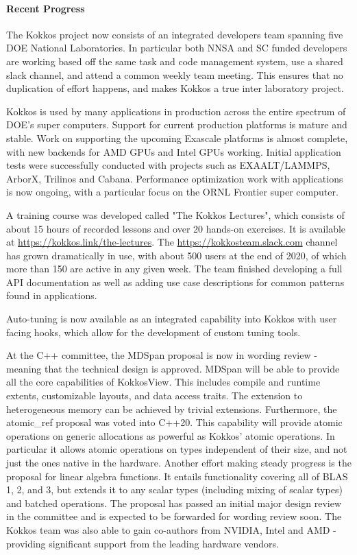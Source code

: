 \paragraph{Recent Progress}

The Kokkos project now consists of an integrated developers team spanning five DOE National Laboratories.
In particular both NNSA and SC funded developers are working based off the same task and code management system, use a shared slack channel, and attend a common weekly team meeting.
This ensures that no duplication of effort happens, and makes Kokkos a true inter laboratory project.

Kokkos is used by many applications in production across the entire spectrum of DOE's super computers.
Support for current production platforms is mature and stable.
Work on supporting the upcoming Exascale platforms is almost complete, with new backends for AMD GPUs and Intel GPUs working. 
Initial application tests were successfully conducted with projects such as EXAALT/LAMMPS, ArborX, Trilinos and Cabana.
Performance optimization work with applications is now ongoing, with a particular focus on the ORNL Frontier super computer.

A training course was developed called "The Kokkos Lectures", which consists of about 15 hours of recorded lessons and over 20 hands-on exercises.
It is available at \url{https://kokkos.link/the-lectures}.
The \url{https://kokkosteam.slack.com} channel has grown dramatically in use, with about 500 users at the end of 2020, of which more than 150 are active in any given week.
The team finished developing a full API documentation as well as adding use case descriptions for common patterns found in applications.

Auto-tuning is now available as an integrated capability into Kokkos with user facing hooks, which allow for the development of custom tuning tools.

At the C++ committee, the MDSpan proposal is now in wording review - meaning that the technical design is approved. 
MDSpan will be able to provide all the core capabilities of Kokkos\:\:View.
This includes compile and runtime extents, customizable layouts, and data access traits.
The extension to heterogeneous memory can be achieved by trivial extensions.
Furthermore, the atomic\_ref proposal was voted into C++20.
This capability will provide atomic operations on generic allocations as powerful as Kokkos' atomic operations.
In particular it allows atomic operations on types independent of their size, and not just the ones native in the hardware.
Another effort making steady progress is the proposal for linear algebra functions.
It entails functionality covering all of BLAS 1, 2, and 3, but extends it to any scalar types (including mixing of scalar types) and batched operations.
The proposal has passed an initial major design review in the committee and is expected to be forwarded for wording review soon.
The Kokkos team was also able to gain co-authors from NVIDIA, Intel and AMD - providing significant support from the leading hardware vendors.

